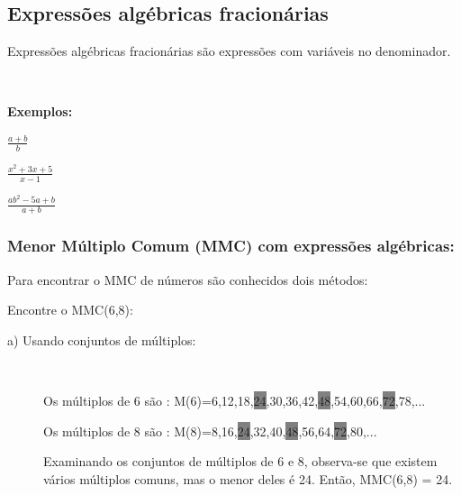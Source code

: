 \subsection{Expressões algébricas fracionárias}

Expressões algébricas fracionárias são expressões com variáveis no denominador.

~~

\noindent\textbf{Exemplos:}
\begin{multicols}{3}
\begin{enumerate}[label=\arabic*)]{\large
\item $\frac{a+b}{b}$

\item $\frac{x^2+3x+5}{x-1}$

\item $\frac{ab^2-5a+b}{a+b}$

}\end{enumerate}
\end{multicols}

\subsubsection{Menor Múltiplo Comum (MMC) com expressões algébricas:}

Para encontrar o MMC de números são conhecidos dois métodos:

Encontre o MMC(6,8):

\begin{description}
    \item [a) Usando conjuntos de múltiplos:]~
        
    Os múltiplos de 6 são : M(6)={6,12,18,\colorbox{gray}{24},30,36,42,\colorbox{gray}{48},54,60,66,\colorbox{gray}{72},78,...}

    Os múltiplos de 8 são : M(8)={8,16,\colorbox{gray}{24},32,40,\colorbox{gray}{48},56,64,\colorbox{gray}{72},80,...}

    Examinando os conjuntos de múltiplos de 6 e 8, observa-se que existem vários múltiplos comuns, mas o menor deles é 24. Então, MMC(6,8) = 24.
\end{description}

